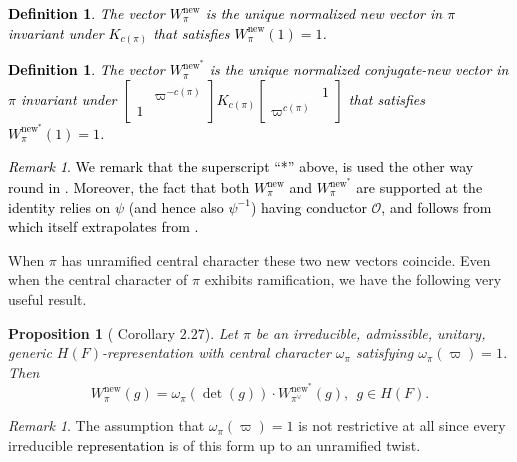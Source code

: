 \documentclass{amsart}
\theoremstyle{plain}
\newtheorem{prop}[thm]{Proposition}
\theoremstyle{plain}
\newtheorem{defn}[thm]{Definition}
\theoremstyle{remark}
\newtheorem{rem}[thm]{Remark}
\begin{document}
\textcolor{black}{\begin{defn}
    The vector $W_\pi^\mathrm{new}$ is the unique normalized new vector in $\pi$ invariant under $K_{c(\pi)}$ that satisfies $W_\pi^\mathrm{new}(1)=1$.
\end{defn}
\begin{defn}
    The vector $W_\pi^\mathrm{new^*}$ is the unique normalized conjugate-new vector in $\pi$ invariant under $\left[\begin{smallmatrix}
        & \varpi^{-c(\pi)}\\
        1 & 
\end{smallmatrix}\right]K_{c(\pi)}\left[\begin{smallmatrix}
        & 1\\
        \varpi^{c(\pi)} & 
    \end{smallmatrix}\right]$ that satisfies $W_\pi^\mathrm{new^*}(1)=1$.
\end{defn}
\begin{rem}
    We remark that the superscript ``*'' above, is used the other way round in \cite[Definitions $2.1\ \&\ 2.2$]{Saha_2015}. Moreover, the fact that both $W_\pi^\mathrm{new}$ and $W_\pi^\mathrm{new^*}$ are supported at the identity relies on $\psi$ (and hence also $\psi^{-1}$) having conductor $\mathcal{O}$, and follows from \cite[Lemma $2.5$]{Saha_2015} which itself extrapolates from \cite{schmidt2002some}.
\end{rem}}
When $\pi$ has unramified central character these two new vectors coincide. Even when the central character of $\pi$ exhibits ramification, we have the following very useful result.
    \begin{prop}[\cite{Saha_2015} Corollary $2.27$]\label{prop new vs conj. new}
        Let $\pi$ be an irreducible, admissible, unitary, generic $H(F)$-representation with central character  $\omega_\pi$ satisfying $\omega_\pi(\varpi)=1$. Then 
        $$W_\pi^\mathrm{new}(g)=\omega_\pi(\det(g))\cdot W_{\pi^\vee}^{\mathrm{new}^*}(g),\ \ g\in H(F).$$
    \end{prop}
     \begin{rem}The assumption that $\omega_\pi(\varpi)=1$ is not restrictive at all since every irreducible \textcolor{black}{representation} is of this form up to an unramified twist. 
\end{rem}
\end{document}
